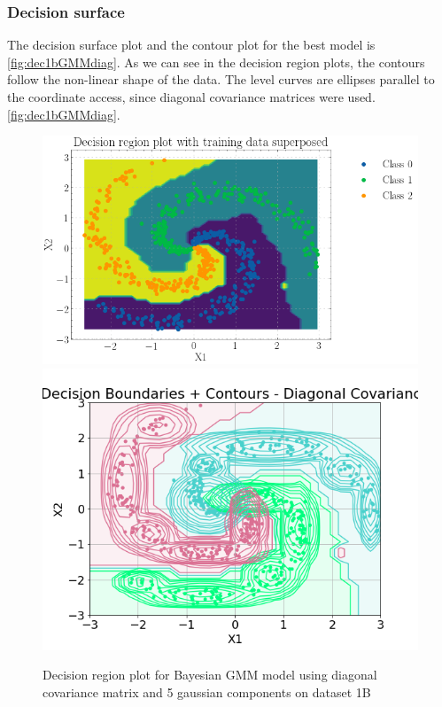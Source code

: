 \documentclass[11pt,a4paper]{article}
\begin{document}
\subsubsection{Decision surface}
The decision surface plot and the contour plot for the best model is \autoref{fig:dec1bGMMdiag}. As we can see in the decision region plots, the contours follow the non-linear shape of the data. The level curves are ellipses parallel to the coordinate access, since diagonal covariance matrices were used. \autoref{fig:dec1bGMMdiag}.
\begin{figure}[H]
    \centering
    \hspace{4em}\includegraphics[scale=0.5]{images/1B/decisionReg_ds2.png}
    \includegraphics[scale=0.5]{images/1B/contour1b.png}
    \caption{Decision region plot for Bayesian GMM model using diagonal covariance matrix and 5 gaussian components on dataset 1B}
    \label{fig:dec1bGMMdiag}
\end{figure}
\end{document}
